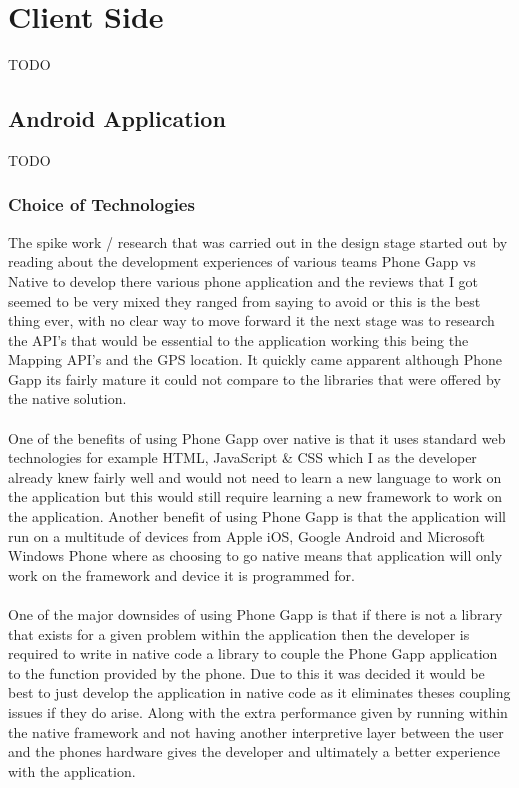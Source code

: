 \section{Client Side}

{TODO}

\subsection{Android Application}

{TODO}

\subsubsection*{Choice of Technologies}
\label{sec:android_choice_of_tech}

The spike work / research that was carried out in the design stage started out by reading about the development experiences of various teams Phone Gapp vs Native to develop there various phone application and the reviews that I got seemed to be very mixed they ranged from saying to avoid or this is the best thing ever, with no clear way to move forward it the next stage was to research the API's that would be essential to the application working this being the Mapping API's and the GPS location. It quickly came apparent although Phone Gapp its fairly mature it could not compare to the libraries that were offered by the native solution.\\
\\
One of the benefits of using Phone Gapp over native is that it uses standard web technologies for example HTML, JavaScript \& CSS which I as the developer already knew fairly well and would not need to learn a new language to work on the application but this would still require learning a new framework to work on the application. Another benefit of using Phone Gapp is that the application will run on a multitude of devices from Apple iOS, Google Android and Microsoft Windows Phone where as choosing to go native means that application will only work on the framework and device it is programmed for.\\
\\
One of the major downsides of using Phone Gapp is that if there is not a library that exists for a given problem within the application then the developer is required to write in native code a library to couple the Phone Gapp application to the function provided by the phone. Due to this it was decided it would be best to just develop the application in native code as it eliminates theses coupling issues if they do arise. Along with the extra performance given by running within the native framework and not having another interpretive layer between the user and the phones hardware gives the developer and ultimately a better experience with the application.\\
